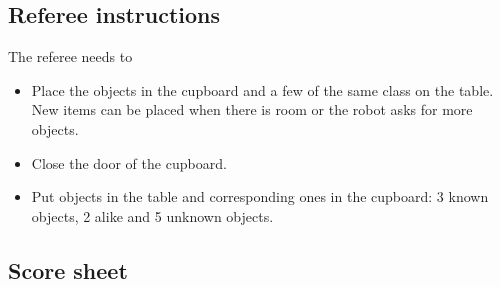 \subsection{Referee instructions}

The referee needs to
\begin{itemize}
\item Place the objects in the cupboard and a few of the same class on the table. New items can be placed when there is room or the robot asks for more objects. 
\item Close the door of the cupboard. 
\item Put objects in the table and corresponding ones in the cupboard: 3 known objects, 2 alike and 5 unknown objects. 
\end{itemize}

\subsection{Score sheet}


